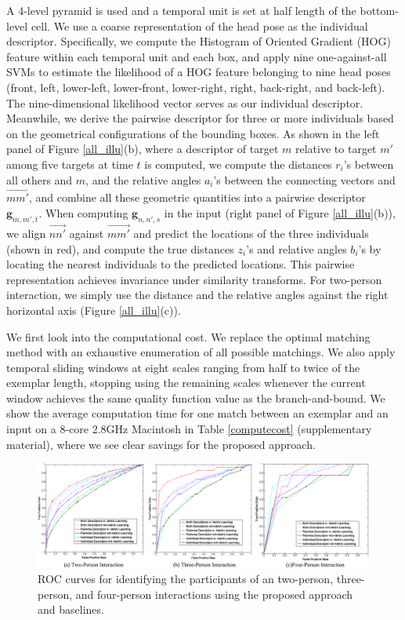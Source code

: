 A 4-level pyramid is used and a temporal unit is set at half length of the bottom-level cell. We use a coarse representation of the head pose as the individual descriptor. Specifically, we compute the Histogram of Oriented Gradient (HOG) feature within each temporal unit and each box, and apply nine one-against-all SVMs to estimate the likelihood of a HOG feature belonging to nine head poses (front, left, lower-left, lower-front, lower-right, right, back-right, and back-left). The nine-dimensional likelihood vector  serves as our individual descriptor. Meanwhile, we derive the pairwise descriptor for three or more individuals based on the geometrical configurations of the bounding boxes. As shown in the left panel of Figure \ref{all_illu}(b), where a descriptor of target $m$ relative to target $m'$ among five targets at time $t$ is computed, we compute the distances $r_{i}$'s between all others and $m$, and the relative angles $a_{i}$'s between the connecting vectors and $\overrightarrow{mm'}$, and combine all these geometric quantities into a pairwise descriptor $\mathbf{g}_{m,m',t}$. When computing $\mathbf{g}_{n,n',s}$ in the input (right panel of Figure \ref{all_illu}(b)), we align $\overrightarrow{nn'}$ against $\overrightarrow{mm'}$ and predict the locations of the three individuals (shown in red), and compute the true distances $z_{i}$'s and relative angles $b_{i}$'s by locating the nearest individuals to the predicted locations. This pairwise representation achieves invariance under similarity transforms. For two-person interaction, we simply use the distance and the relative angles against the right horizontal axis (Figure \ref{all_illu}(c)). 

We first look into the computational cost. We replace the optimal matching method with an exhaustive enumeration of all possible matchings. We also apply temporal sliding windows at eight scales ranging from half to twice of the exemplar length, stopping using the remaining scales whenever the current window achieves the same quality function value as the branch-and-bound. We show the average computation time for one match between an exemplar and an input on a 8-core 2.8GHz Macintosh in Table \ref{computecost} (supplementary material), where we see clear savings for the proposed approach.

\begin{figure}[t]
\begin{center}
\includegraphics[scale=2.5]{ROC.png}
\end{center}
\caption{ROC curves for identifying the participants of an two-person, three-person, and four-person interactions using the proposed approach and baselines. }
\label{ROC}
\end{figure}

